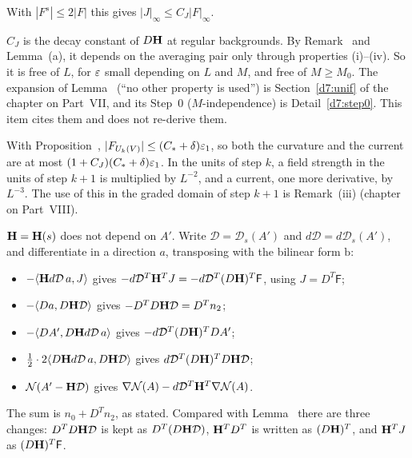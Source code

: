 \begin{detail}
\begin{step}
\begin{itemize}
\end{itemize}
With $|F^s|\le2|F|$ this gives $|J|_\infty\le C_J|F|_\infty$.
\end{step}
\begin{step}[Constants]
$C_J$ is the decay constant of $D\mathbf H$ at regular backgrounds. By Remark~ and Lemma~(a), it depends on the averaging pair only through properties (i)--(iv). So it is free of $L$, for $\varepsilon$ small depending on $L$ and $M$, and free of $M\ge M_0$. The expansion of Lemma~ (``no other property is used'') is Section~\ref{d7:unif} of the chapter on Part~VII, and its Step~0 ($M$-independence) is Detail~\ref{d7:step0}. This item cites them and does not re-derive them.
\end{step}
\begin{step}
With Proposition~, $|F_{U_k(V)}|\le(C_*+\delta)\varepsilon_1$, so both the curvature and the current are at most $(1+C_J)(C_*+\delta)\varepsilon_1$. In the units of step $k$, a field strength in the units of step $k+1$ is multiplied by $L^{-2}$, and a current, one more derivative, by $L^{-3}$. The use of this in the graded domain of step $k+1$ is Remark~(iii) (chapter on Part~VIII).
\end{step}
\end{detail}

\begin{detail}\label{d9:gradV}
$\mathbf H=\mathbf H(s)$ does not depend on $A'$. Write $\mathcal D=\mathcal D_s(A')$ and $d\mathcal D=d\mathcal D_s(A')$, and differentiate in a direction $a$, transposing with the bilinear form $\mathrm b$:
\begin{itemize}
\item $-\langle \mathbf H d\mathcal D\,a,J\rangle$ gives $-d\mathcal D^T\mathbf H^TJ=-d\mathcal D^T(D\mathbf H)^T\mathsf F$, using $J=D^T\mathsf F$;
\item $-\langle Da,D\mathbf H\mathcal D\rangle$ gives $-D^TD\mathbf H\mathcal D=D^Tn_2$;
\item $-\langle DA',D\mathbf H d\mathcal D\,a\rangle$ gives $-d\mathcal D^T(D\mathbf H)^TDA'$;
\item $\frac12\cdot2\langle D\mathbf H d\mathcal D\,a,D\mathbf H\mathcal D\rangle$ gives $d\mathcal D^T(D\mathbf H)^TD\mathbf H\mathcal D$;
\item $\mathcal N(A'-\mathbf H\mathcal D)$ gives $\nabla\mathcal N(A)-d\mathcal D^T\mathbf H^T\nabla\mathcal N(A)$.
\end{itemize}
The sum is $n_0+D^Tn_2$, as stated. Compared with Lemma~ there are three changes: $D^TD\mathbf H\mathcal D$ is kept as $D^T(D\mathbf H\mathcal D)$, $\mathbf H^TD^T$ is written as $(D\mathbf H)^T$, and $\mathbf H^TJ$ as $(D\mathbf H)^T\mathsf F$.
\end{detail}

